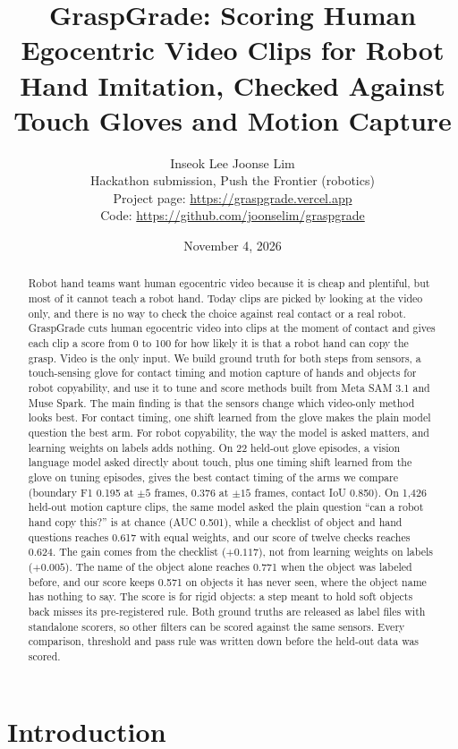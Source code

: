 \documentclass[10pt,twocolumn,letterpaper]{article}
\title{\textbf{GraspGrade: Scoring Human Egocentric Video Clips for Robot Hand
Imitation, Checked Against Touch Gloves and Motion Capture}}
\author{Inseok Lee \qquad Joonse Lim\\
\small Hackathon submission, Push the Frontier (robotics)\\
\small Project page: \url{https://graspgrade.vercel.app}\\
\small Code: \url{https://github.com/joonselim/graspgrade}}
\date{November 4, 2026}
\begin{document}
\maketitle

\begin{abstract}
Robot hand teams want human egocentric video because it is cheap and
plentiful, but most of it cannot teach a robot hand. Today clips are picked
by looking at the video only, and there is no way to check the choice against
real contact or a real robot. GraspGrade cuts human egocentric video into clips at
the moment of contact and gives each clip a score from 0 to 100 for how likely
it is that a robot hand can copy the grasp. Video is the only input. We build
ground truth for both steps from sensors, a touch-sensing glove for contact
timing and motion capture of hands and objects for robot copyability, and use
it to tune and score methods built from Meta SAM 3.1 and Muse Spark. The
main finding is that the sensors change which video-only method looks best.
For contact timing, one shift learned from the glove makes the plain model
question the best arm. For robot copyability, the way the model is asked
matters, and learning weights on labels adds nothing. On 22 held-out glove episodes, a vision language model asked
directly about touch, plus one timing shift learned from the glove on tuning
episodes, gives the best contact timing of the arms we compare (boundary F1
0.195 at $\pm 5$ frames, 0.376 at $\pm 15$ frames, contact IoU 0.850). On
1,426 held-out motion capture clips, the same model asked the plain question
``can a robot hand copy this?'' is at chance (AUC 0.501), while a checklist
of object and hand questions reaches 0.617 with equal weights, and our score
of twelve checks reaches 0.624. The gain comes from the
checklist ($+0.117$), not from learning weights on labels ($+0.005$). The name
of the object alone reaches 0.771 when the object was labeled before, and our
score keeps 0.571 on objects it has never seen, where the object name has
nothing to say. The score is for rigid objects: a step meant to hold soft
objects back misses its pre-registered rule. Both ground truths are released
as label files with
standalone scorers, so other filters can be scored against the same sensors.
Every comparison, threshold and pass rule was written down before the held-out
data was scored.
\end{abstract}

\section{Introduction}
\end{document}
